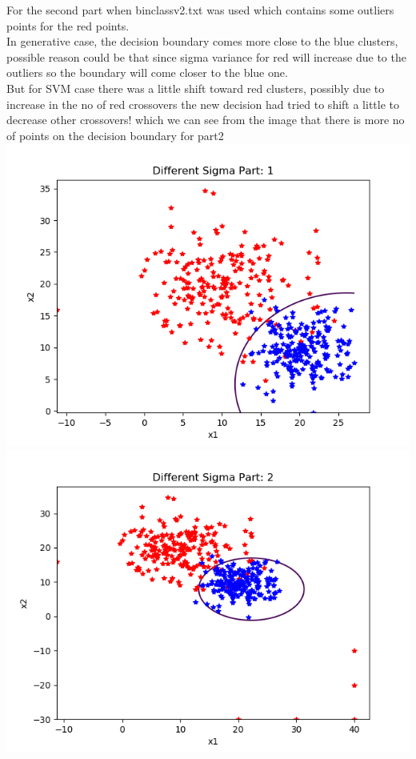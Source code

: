 \documentclass[a4paper,11pt]{article}
\begin{document}
\begin{mlsolution}
  \noindent For the second part when binclassv2.txt was used which contains some outliers points for the red points.
  \\In generative case, the decision boundary comes more close to the blue clusters, possible reason could be that since sigma variance for red will increase due to the outliers so the boundary will come closer to the blue one.\\
  But for SVM case there was a little shift toward red clusters, possibly due to increase in the no of red crossovers the new decision had tried to shift a little to decrease other crossovers! which we can see from the image that there is more no of points on the decision boundary for part2\\
  \includegraphics{Figure_1}
  \includegraphics{Figure_12}

\end{mlsolution}
\end{document}
